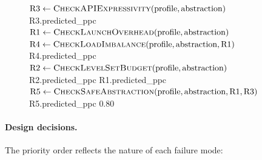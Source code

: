 \begin{figure}[t]
\centering
\begin{minipage}{0.92\linewidth}
\begin{algorithmic}[1]
    \State $\text{R3} \gets \Call{CheckAPIExpressivity}{\text{profile}, \text{abstraction}}$
        \State \Return R3.predicted\_ppc 
    \EndIf
    \State $\text{R1} \gets \Call{CheckLaunchOverhead}{\text{profile}, \text{abstraction}}$
    \State $\text{R4} \gets \Call{CheckLoadImbalance}{\text{profile}, \text{abstraction}, \text{R1}}$
        \State \Return R4.predicted\_ppc 
    \EndIf
    \State $\text{R2} \gets \Call{CheckLevelSetBudget}{\text{profile}, \text{abstraction}}$
        \State \Return R2.predicted\_ppc 
    \EndIf
        \State \Return R1.predicted\_ppc 
    \EndIf
    \State $\text{R5} \gets \Call{CheckSafeAbstraction}{\text{profile}, \text{abstraction}, \text{R1}, \text{R3}}$
        \State \Return R5.predicted\_ppc 
    \EndIf
    \State \Return $0.80$ 
\EndFunction
\end{algorithmic}
\end{minipage}
\label{alg:predict}
\end{figure}

\paragraph{Design decisions.}
The priority order reflects the nature of each failure mode:

